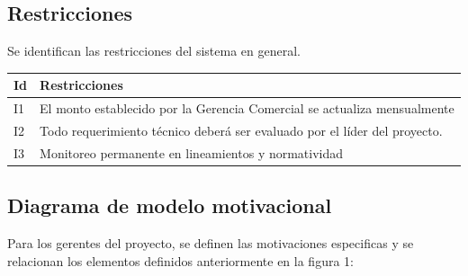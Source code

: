 \documentclass[12pt]{article}
\begin{document}


\subsection{Restricciones}
Se identifican las restricciones del sistema en general.

\begin{table}[H]
\centering
\begin{tabular}{|l|l|}
\hline
\textbf{Id} & \textbf{Restricciones} \\ \hline
I1 & El monto establecido por la Gerencia Comercial se actualiza mensualmente \\ \hline
I2 & Todo requerimiento técnico deberá ser evaluado por el líder del proyecto. \\ \hline
I3 & Monitoreo permanente en lineamientos y normatividad \\ \hline
\end{tabular}
\end{table}






\subsection{Diagrama de modelo motivacional}

Para los gerentes del proyecto, se definen las motivaciones especificas y se relacionan los elementos definidos anteriormente en la figura 1:
\end{document}
